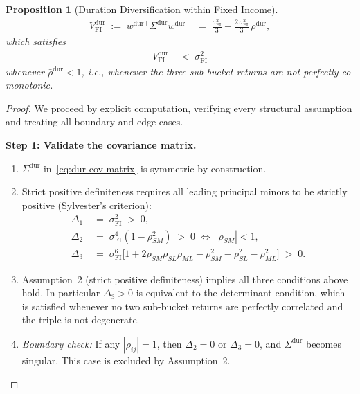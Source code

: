 \documentclass[12pt,openany]{book}
\newcommand{\bfw}{\mathbf{w}}
\numberwithin{equation}{chapter}
\theoremstyle{plain}
\newtheorem{proposition}[theorem]{Proposition}
\theoremstyle{definition}
\theoremstyle{remark}
\def\bfw{w}%
\begin{document}
\begin{proposition}[Duration Diversification within Fixed Income]
\begin{align}
  V_{\mathrm{FI}}^{\mathrm{dur}}
  \;:=\; \bfw^{\mathrm{dur}\top}\Sigma^{\mathrm{dur}}\bfw^{\mathrm{dur}}
  &\;=\;
  \frac{\sigma_{\mathrm{FI}}^2}{3}
  + \frac{2\,\sigma_{\mathrm{FI}}^2}{3}\,\bar{\rho}^{\mathrm{dur}},
  \label{eq:duration-div-exact}
\end{align}
which satisfies
\begin{align}
  V_{\mathrm{FI}}^{\mathrm{dur}}
  &\;<\; \sigma_{\mathrm{FI}}^2
  \label{eq:duration-div}
\end{align}
whenever $\bar{\rho}^{\mathrm{dur}} < 1$, i.e., whenever the three
sub-bucket returns are not perfectly co-monotonic.
\end{proposition}

\begin{proof}
We proceed by explicit computation, verifying every structural
assumption and treating all boundary and edge cases.

\medskip
\noindent\textbf{Step 1: Validate the covariance matrix.}

\begin{enumerate}
  \item $\Sigma^{\mathrm{dur}}$ in~\eqref{eq:dur-cov-matrix} is
        symmetric by construction.
  \item Strict positive definiteness requires all leading principal
        minors to be strictly positive (Sylvester's criterion):
        \begin{align}
          \Delta_1 &\;=\; \sigma_{\mathrm{FI}}^2 \;>\; 0,
          \\
          \Delta_2 &\;=\; \sigma_{\mathrm{FI}}^4
                          (1 - \rho_{SM}^2) \;>\; 0
                    \;\Longleftrightarrow\;
                    |\rho_{SM}| < 1,
          \\
          \Delta_3 &\;=\; \sigma_{\mathrm{FI}}^6\bigl[
                          1 + 2\rho_{SM}\rho_{SL}\rho_{ML}
                          - \rho_{SM}^2 - \rho_{SL}^2
                          - \rho_{ML}^2
                        \bigr] \;>\; 0.
        \end{align}
  \item Assumption~2 (strict positive definiteness) implies all
        three conditions above hold.  In particular $\Delta_3 > 0$
        is equivalent to the determinant condition, which is
        satisfied whenever no two sub-bucket returns are perfectly
        correlated and the triple is not degenerate.
  \item \textit{Boundary check:}  If any $|\rho_{ij}| = 1$, then
        $\Delta_2 = 0$ or $\Delta_3 = 0$, and $\Sigma^{\mathrm{dur}}$
        becomes singular.  This case is excluded by Assumption~2.
\end{enumerate}


\end{proof}
\end{document}
